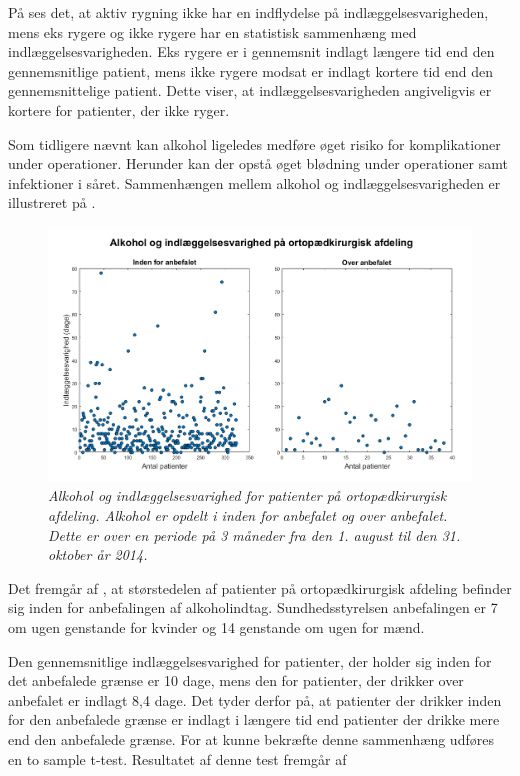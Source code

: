 \noindent
På  ses det, at aktiv rygning ikke har en indflydelse på indlæggelsesvarigheden, mens eks rygere og ikke rygere har en statistisk sammenhæng med indlæggelsesvarigheden. Eks rygere er i gennemsnit indlagt længere tid end den gennemsnitlige patient, mens ikke rygere modsat er indlagt kortere tid end den gennemsnittelige patient. Dette viser, at indlæggelsesvarigheden angiveligvis er kortere for patienter, der ikke ryger. 


Som tidligere nævnt kan alkohol ligeledes medføre øget risiko for komplikationer under operationer. Herunder kan der opstå øget blødning under operationer samt infektioner i såret.\cite{Nordjylland2014} Sammenhængen mellem alkohol og indlæggelsesvarigheden er illustreret på  . 


\begin{figure}[H]
	\centering
	\includegraphics[scale=0.4]{figures/alkohologindlaeg}
	\caption{\textit{Alkohol og indlæggelsesvarighed for patienter på ortopædkirurgisk afdeling. Alkohol er opdelt i inden for anbefalet og over anbefalet. Dette er over en periode på 3 måneder fra den 1. august til den 31. oktober år 2014. }}
	\label{alkohologindlaeggelse}
\end{figure}

\noindent
Det fremgår af , at størstedelen af patienter på ortopædkirurgisk afdeling befinder sig inden for anbefalingen af alkoholindtag. Sundhedsstyrelsen anbefalingen er 7 om ugen genstande for kvinder og 14 genstande om ugen for mænd\citep{Sundhedsstyrelsen2016}.


Den gennemsnitlige indlæggelsesvarighed for patienter, der holder sig inden for det anbefalede grænse er 10 dage, mens den for patienter, der drikker over anbefalet er indlagt 8,4 dage. Det tyder derfor på, at patienter der drikker inden for den anbefalede grænse er indlagt i længere tid end patienter der drikke mere end den anbefalede grænse. 
For at kunne bekræfte denne sammenhæng udføres en to sample t-test. Resultatet af denne test fremgår af 


